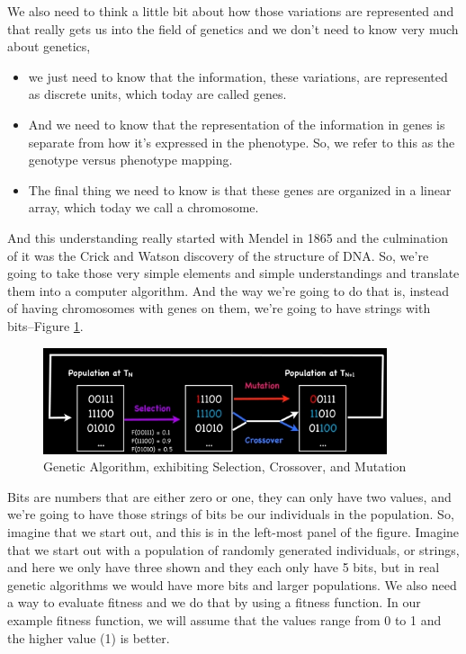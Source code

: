 \documentclass[]{article}
\begin{document}
We also need to think a little bit about
how those variations are represented
and that really gets us into the field of genetics
and we don't need to know very
much about genetics, \begin{itemize}
	\item we just need to know that the information, these variations, are represented as discrete units, which today are called genes.

	\item And we need to know that the representation of the information in genes is separate from how it's expressed in the phenotype. So, we refer to this as the genotype versus phenotype mapping.

	\item The final thing we need to know is that these genes are organized in a linear array, which today we call a chromosome.
\end{itemize}

And this understanding really started with Mendel in 1865 and the culmination of it was the Crick and Watson discovery of the structure of DNA.
So, we're going to take those very simple
elements and simple understandings and
translate them into a computer algorithm.
And the way we're going to do that is,
instead of having chromosomes with genes
on them, we're going to have strings with bits--Figure \ref{fig:GeneticAlgorithm}.

\begin{figure}[H]
	\caption[Genetic Algorithm, exhibiting Selection, Crossover, and Mutation]{Genetic Algorithm, exhibiting Selection, Crossover, and Mutation\cite{holland1992adaptation}}\label{fig:GeneticAlgorithm}
	\includegraphics[width=0.9\textwidth]{GeneticAlgorithm}
\end{figure}



Bits are numbers that are either
zero or one, they can only have two values,
and we're going to have those strings of bits
be our individuals in the population.
So, imagine that we start out, and this is
in the left-most panel of the figure.
Imagine that we start out with a population
of randomly generated individuals, or strings,
and here we only have three shown and they
each only have 5 bits, but in real genetic
algorithms we would have more bits and
larger populations.
We also need a way to evaluate fitness
and we do that by using a fitness function.
In our example fitness function, we will assume
that the values range from 0 to 1 and the
higher value (1) is better.
\end{document}
